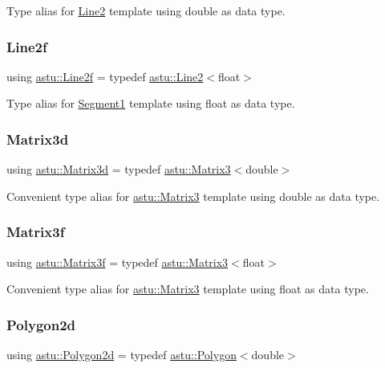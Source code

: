 Type alias for \hyperlink{classastu_1_1Line2}{Line2} template using double as data type. \mbox{\label{namespaceastu_a6fbecdd0d3f742bdde8f5c000c3a8b5d}} 
\subsubsection{\texorpdfstring{Line2f}{Line2f}}
{\footnotesize\ttfamily using \hyperlink{namespaceastu_a6fbecdd0d3f742bdde8f5c000c3a8b5d}{astu\+::\+Line2f} = typedef \hyperlink{classastu_1_1Line2}{astu\+::\+Line2}$<$float$>$}

Type alias for \hyperlink{classastu_1_1Segment1}{Segment1} template using float as data type. \mbox{\label{namespaceastu_a4453ec0de4066f92d38c78701b52c148}} 
\subsubsection{\texorpdfstring{Matrix3d}{Matrix3d}}
{\footnotesize\ttfamily using \hyperlink{namespaceastu_a4453ec0de4066f92d38c78701b52c148}{astu\+::\+Matrix3d} = typedef \hyperlink{classastu_1_1Matrix3}{astu\+::\+Matrix3}$<$double$>$}

Convenient type alias for \hyperlink{classastu_1_1Matrix3}{astu\+::\+Matrix3} template using double as data type. \mbox{\label{namespaceastu_a59c09794d42987e02b85ce8ccb2de101}} 
\subsubsection{\texorpdfstring{Matrix3f}{Matrix3f}}
{\footnotesize\ttfamily using \hyperlink{namespaceastu_a59c09794d42987e02b85ce8ccb2de101}{astu\+::\+Matrix3f} = typedef \hyperlink{classastu_1_1Matrix3}{astu\+::\+Matrix3}$<$float$>$}

Convenient type alias for \hyperlink{classastu_1_1Matrix3}{astu\+::\+Matrix3} template using float as data type. \mbox{\label{namespaceastu_abc60e44721faec63659fd29e46d21522}} 
\subsubsection{\texorpdfstring{Polygon2d}{Polygon2d}}
{\footnotesize\ttfamily using \hyperlink{namespaceastu_abc60e44721faec63659fd29e46d21522}{astu\+::\+Polygon2d} = typedef \hyperlink{classastu_1_1Polygon}{astu\+::\+Polygon}$<$double$>$}

